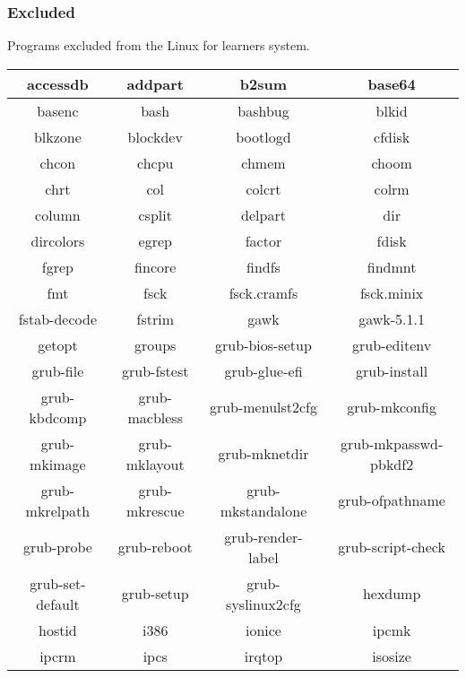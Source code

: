 \newpage

\subsubsection{Excluded}

Programs excluded from the Linux for learners system.

\begin{center}
    \begin{tabular}{|c|c|c|c|}
        \hline
        accessdb & addpart & b2sum & base64 \\
        \hline
        basenc & bash & bashbug & blkid \\
        \hline
        blkzone & blockdev & bootlogd & cfdisk \\
        \hline
        chcon & chcpu & chmem & choom \\
        \hline
        chrt & col & colcrt & colrm \\
        \hline
        column & csplit & delpart & dir \\
        \hline
        dircolors & egrep & factor & fdisk \\
        \hline
        fgrep & fincore & findfs & findmnt \\
        \hline
        fmt & fsck & fsck.cramfs & fsck.minix \\
        \hline
        fstab-decode & fstrim & gawk & gawk-5.1.1 \\
        \hline
        getopt & groups & grub-bios-setup & grub-editenv \\
        \hline
        grub-file & grub-fstest & grub-glue-efi & grub-install \\
        \hline
        grub-kbdcomp & grub-macbless & grub-menulst2cfg & grub-mkconfig \\
        \hline
        grub-mkimage & grub-mklayout & grub-mknetdir & grub-mkpasswd-pbkdf2 \\
        \hline
        grub-mkrelpath & grub-mkrescue & grub-mkstandalone & grub-ofpathname \\
        \hline
        grub-probe & grub-reboot & grub-render-label & grub-script-check \\
        \hline
        grub-set-default & grub-setup & grub-syslinux2cfg & hexdump \\
        \hline
        hostid & i386 & ionice & ipcmk \\
        \hline
        ipcrm & ipcs & irqtop & isosize \\
        \hline
    \end{tabular}
\end{center}

